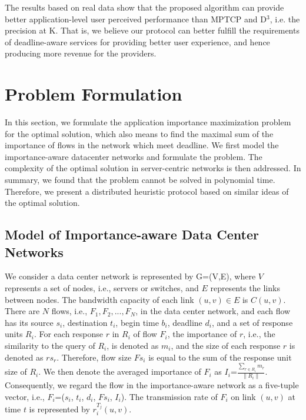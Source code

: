 \documentclass[conference]{IEEEtran}
\begin{document}
The results based on real data show that the proposed algorithm can provide better application-level user perceived performance than MPTCP\cite{mptcp} and D$^{3}$\cite{deadline}, i.e. the precision at K. That is, we believe our protocol can better fulfill the requirements of deadline-aware services for providing better user experience, and hence producing more revenue for the providers.



\section{Problem Formulation}
In this section, we formulate the application importance maximization problem for the optimal solution, which also means to find the maximal sum of the importance of flows in the network which meet deadline. We first model the importance-aware datacenter networks and formulate the problem. The complexity of the optimal solution in server-centric networks is then addressed. In summary, we found that the problem cannot be solved in polynomial time. Therefore, we present a distributed heuristic protocol based on similar ideas of the optimal solution.

\subsection{Model of Importance-aware Data Center Networks}
We consider a data center network is represented by G=(V,E), where $V$ represents a set of nodes, i.e., servers or switches, and $E$ represents the links between nodes. The bandwidth capacity of each link $(u,v)\in E$ is $C(u,v)$. There are $N$ flows, i.e., $F_{1}, F_{2},...,F_{N}$, in the data center network, and each flow has its source $s_{i}$, destination $t_{i}$, begin time $b_{i}$, deadline $d_{i}$, and a set of response units $R_{i}$. For each response $r$ in $R_{i}$ of flow $F_{i}$, the importance of $r$, i.e., the similarity to the query of $R_{i}$, is denoted as $m_{i}$, and the size of each response $r$ is denoted as $rs_{r}$. Therefore, flow size $Fs_{i}$ is equal to the sum of the response unit size of $R_{i}$. We then denote the averaged importance of $F_{i}$ as $I_{i}$=$\frac{\sum_{r\in R_{i}}m_{r}}{\|R_{i}\|}$. Consequently, we regard the flow in the importance-aware network as a five-tuple vector, i.e., $F_{i}$=($s_{i}$, $t_{i}$, $d_{i}$, $Fs_{i}$, $I_{i}$). The transmission rate of $F_{i}$ on link $(u,v)$ at time $t$ is represented by $r_{i}^{T_{j}}(u,v)$.
\end{document}
